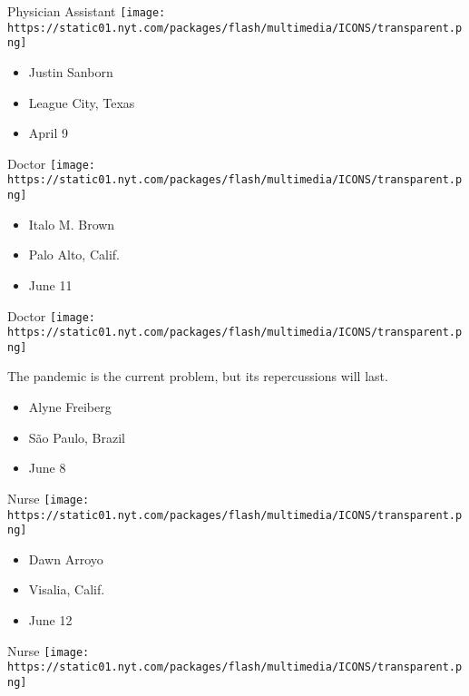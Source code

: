 \protect\hyperlink{item-justin-sanborn}{}

Physician Assistant
\texttt{[image: https://static01.nyt.com/packages/flash/multimedia/ICONS/transparent.png]}

\begin{itemize}
\tightlist
\item
  Justin Sanborn
\item
  League City, Texas
\item
  April 9
\end{itemize}

\protect\hyperlink{item-italo-m-brown}{}

Doctor
\texttt{[image: https://static01.nyt.com/packages/flash/multimedia/ICONS/transparent.png]}

\begin{itemize}
\tightlist
\item
  Italo M. Brown
\item
  Palo Alto, Calif.
\item
  June 11
\end{itemize}

\protect\hyperlink{item-alyne-freiberg}{}

Doctor
\texttt{[image: https://static01.nyt.com/packages/flash/multimedia/ICONS/transparent.png]}

The pandemic is the current problem, but its repercussions will last.

\begin{itemize}
\tightlist
\item
  Alyne Freiberg
\item
  São Paulo, Brazil
\item
  June 8
\end{itemize}

\protect\hyperlink{item-dawn-arroyo}{}

Nurse
\texttt{[image: https://static01.nyt.com/packages/flash/multimedia/ICONS/transparent.png]}

\begin{itemize}
\tightlist
\item
  Dawn Arroyo
\item
  Visalia, Calif.
\item
  June 12
\end{itemize}

\protect\hyperlink{item-vanessa-hernandez}{}

Nurse
\texttt{[image: https://static01.nyt.com/packages/flash/multimedia/ICONS/transparent.png]}

